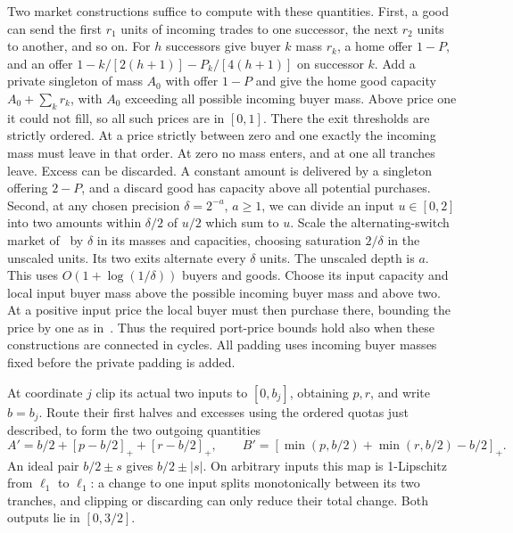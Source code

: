 \documentclass[11pt,oneside,openany,notitlepage]{report}
\begin{document}
Two market constructions suffice to compute with these quantities.
First, a good can send the first \(r_1\) units of incoming trades to one
successor, the next \(r_2\) units to another, and so on. For \(h\)
successors give buyer \(k\) mass \(r_k\), a home offer \(1-P\), and an
offer \(1-k/[2(h+1)]-P_k/[4(h+1)]\) on successor \(k\).
Add a private singleton of mass \(A_0\) with offer \(1-P\) and give
the home good capacity \(A_0+\sum_k r_k\), with \(A_0\) exceeding all
possible incoming buyer mass. Above price one it could not fill, so
all such prices are in \([0,1]\). There the exit thresholds are strictly
ordered. At a price strictly between zero and one exactly the incoming
mass must leave in that order. At zero no mass enters, and at one all
tranches leave. Excess can be discarded. A constant amount is delivered
by a singleton offering \(2-P\), and a discard good has capacity above
all potential purchases. Second, at any chosen precision \(\delta=2^{-a}\), \(a\ge1\), we can divide
an input \(u\in[0,2]\) into two amounts within \(\delta/2\) of \(u/2\)
which sum to \(u\). Scale the alternating-switch market
of~\cite[Theorem~4.7]{book} by \(\delta\) in its masses and capacities,
choosing saturation \(2/\delta\) in the unscaled units. Its two exits
alternate every \(\delta\) units. The unscaled depth is \(a\). This uses \(O(1+\log(1/\delta))\)
buyers and goods. Choose its input capacity and local input buyer mass
above the possible incoming buyer mass and above two. At a positive input
price the local buyer must then purchase there, bounding the price by
one as in~\cite[Theorem~4.4]{book}. Thus the required port-price bounds
hold also when these constructions are connected in cycles. All padding
uses incoming buyer masses fixed before the private padding is added.

At coordinate \(j\) clip its actual two inputs to \([0,b_j]\), obtaining
\(p,r\), and write \(b=b_j\). Route their first halves and excesses using
the ordered quotas just described, to form the two outgoing quantities
\[
 A'=b/2+[p-b/2]_++[r-b/2]_+,\qquad
 B'=[\min(p,b/2)+\min(r,b/2)-b/2]_+ .
\]
An ideal pair \(b/2\pm s\) gives \(b/2\pm|s|\). On arbitrary inputs
this map is 1-Lipschitz from \(\ell_1\) to \(\ell_1\): a change to one
input splits monotonically between its two tranches, and clipping or
discarding can only reduce their total change. Both outputs lie in
\([0,3/2]\).
\end{document}
